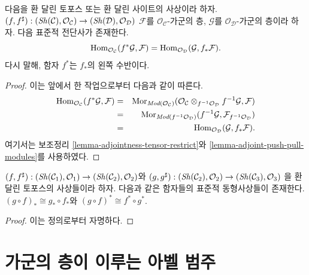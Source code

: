 \begin{lemma}
\label{lemma-adjoint-pullback-pushforward-modules}
다음을 환 달린 토포스 또는 환 달린 사이트의 사상이라 하자.
$(f, f^\sharp) :
(\mathop{\mathit{Sh}}\nolimits(\mathcal{C}), \mathcal{O}_\mathcal{C})
\to
(\mathop{\mathit{Sh}}\nolimits(\mathcal{D}), \mathcal{O}_\mathcal{D})$
$\mathcal{F}$를 $\mathcal{O}_\mathcal{C}$-가군의 층,
$\mathcal{G}$를 $\mathcal{O}_\mathcal{D}$-가군의 층이라 하자.
다음 표준적 전단사가 존재한다.
$$
\mathop{\mathrm{Hom}}\nolimits_{\mathcal{O}_\mathcal{C}}(f^*\mathcal{G}, \mathcal{F})
=
\mathop{\mathrm{Hom}}\nolimits_{\mathcal{O}_\mathcal{D}}(\mathcal{G}, f_*\mathcal{F}).
$$
다시 말해, 함자 $f^*$는 $f_*$의 왼쪽 수반이다.
\end{lemma}

\begin{proof}
이는 앞에서 한 작업으로부터 다음과 같이 따른다.
\begin{eqnarray*}
\mathop{\mathrm{Hom}}\nolimits_{\mathcal{O}_\mathcal{C}}(f^*\mathcal{G}, \mathcal{F})
& = &
\mathop{\mathrm{Mor}}\nolimits_{\textit{Mod}(\mathcal{O}_\mathcal{C})}(
\mathcal{O}_\mathcal{C}
\otimes_{f^{-1}\mathcal{O}_\mathcal{D}} f^{-1}\mathcal{G},
\mathcal{F}) \\
& = &
\mathop{\mathrm{Mor}}\nolimits_{\textit{Mod}(f^{-1}\mathcal{O}_\mathcal{D})}(
f^{-1}\mathcal{G}, \mathcal{F}_{f^{-1}\mathcal{O}_\mathcal{D}}) \\
& = &
\mathop{\mathrm{Hom}}\nolimits_{\mathcal{O}_\mathcal{D}}(\mathcal{G}, f_*\mathcal{F}).
\end{eqnarray*}
여기서는 보조정리 \ref{lemma-adjointness-tensor-restrict}와
\ref{lemma-adjoint-push-pull-modules}를 사용하였다.
\end{proof}

\begin{lemma}
\label{lemma-push-pull-composition-modules}
$(f, f^\sharp) :
(\mathop{\mathit{Sh}}\nolimits(\mathcal{C}_1), \mathcal{O}_1)
\to (\mathop{\mathit{Sh}}\nolimits(\mathcal{C}_2), \mathcal{O}_2)$와
$(g, g^\sharp) :
(\mathop{\mathit{Sh}}\nolimits(\mathcal{C}_2), \mathcal{O}_2) \to
(\mathop{\mathit{Sh}}\nolimits(\mathcal{C}_3), \mathcal{O}_3)$
을 환 달린 토포스의 사상들이라 하자.
다음과 같은 함자들의 표준적 동형사상들이 존재한다.
$(g \circ f)_* \cong g_* \circ f_*$와
$(g \circ f)^* \cong f^* \circ g^*$.
\end{lemma}

\begin{proof}
이는 정의로부터 자명하다.
\end{proof}





\section{가군의 층이 이루는 아벨 범주}
\label{section-kernels}

